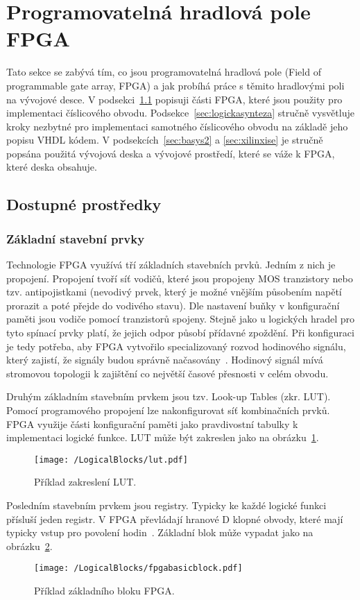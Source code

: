 \documentclass{report}
\begin{document}
\section{Programovatelná hradlová pole FPGA}\label{sec:fpga}
Tato sekce se zabývá tím, co jsou programovatelná hradlová pole (Field of programmable gate array, FPGA) a jak probíhá práce s těmito hradlovými poli na vývojové desce. V podsekci~\ref{sec:dostupneprostredky} popisuji části FPGA, které jsou použity pro implementaci číslicového obvodu. Podsekce~\ref{sec:logickasynteza} stručně vysvětluje kroky nezbytné pro implementaci samotného číslicového obvodu na základě jeho popisu VHDL kódem. V podsekcích~\ref{sec:basys2} a \ref{sec:xilinxise} je stručně popsána použitá vývojová deska a vývojové prostředí, které se váže k FPGA, které deska obsahuje.

\subsection{Dostupné prostředky}\label{sec:dostupneprostredky}
\subsubsection{Základní stavební prvky}
Technologie FPGA využívá tří základních stavebních prvků. Jedním z nich je propojení. Propojení tvoří síť vodičů, které jsou propojeny MOS tranzistory nebo tzv. antipojistkami (nevodivý prvek, který je možné vnějším působením napětí prorazit a poté přejde do vodivého stavu). Dle nastavení buňky v konfigurační paměti jsou vodiče pomocí tranzistorů spojeny. Stejně jako u logických hradel pro tyto spínací prvky platí, že jejich odpor působí přídavné zpoždění. Při konfiguraci je tedy potřeba, aby FPGA vytvořilo specializovaný rozvod hodinového signálu, který zajistí, že signály budou správně načasovány~\cite{fpgatechnology}. Hodinový signál mívá stromovou topologii k zajištění co největší časové přesnosti v celém obvodu. \par Druhým základním stavebním prvkem jsou tzv. Look-up Tables (zkr. LUT). Pomocí programového propojení lze nakonfigurovat síť kombinačních prvků. FPGA využije části konfigurační paměti jako pravdivostní tabulky  k implementaci logické funkce. LUT může být zakreslen jako na obrázku~\ref{fig:lut}. 
\begin{figure}
\centering
\texttt{[image: /LogicalBlocks/lut.pdf]}
\caption{Příklad zakreslení LUT.}
\label{fig:lut}
\end{figure}
\par Posledním stavebním prvkem jsou registry. Typicky ke každé logické funkci přísluší jeden registr. V FPGA převládají hranové D klopné obvody, které mají typicky vstup pro povolení hodin~\cite{fpgatechnology}. Základní blok může vypadat jako na obrázku~\ref{fig:basicblockfpga}. 
\begin{figure}
\centering
\texttt{[image: /LogicalBlocks/fpgabasicblock.pdf]}
\caption{Příklad základního bloku FPGA.}
\label{fig:basicblockfpga}
\end{figure}
\end{document}
